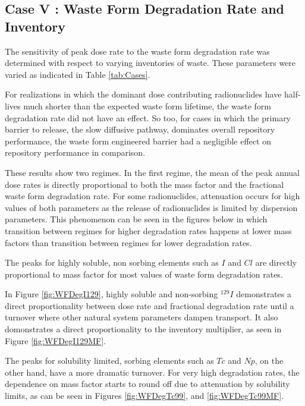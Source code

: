 
\subsection{Case V : Waste Form Degradation Rate and Inventory}

The sensitivity of peak dose rate to the waste form degradation rate was 
determined with respect to varying inventories of waste. These parameters were 
varied as indicated in Table \ref{tab:Cases}.

For realizations in which the dominant dose contributing 
radionuclides have half-lives much shorter than the expected waste form lifetime, 
the waste form degradation rate did not have an effect. So too, for 
cases in which the primary barrier to release, the slow diffusive pathway, 
dominates overall repository performance, the waste form engineered barrier
had a negligible effect on repository performance in comparison.

These results show two regimes. In the first regime, the mean of the peak annual 
dose rates is directly proportional to both the mass factor and the fractional 
waste form degradation rate. For some radionuclides, attenuation occurs for high 
values of both parameters as the release of radionuclides is limited by 
dispersion parameters. This phenomenon can be seen in the figures below in which 
transition between regimes for higher degradation rates happens at lower mass 
factors than transition between regimes for lower degradation rates. 

The peaks for highly soluble, non sorbing elements such as $I$ and $Cl$
are directly proportional to mass factor for most 
values of waste form degradation rates. 

In Figure \ref{fig:WFDegI129}, highly soluble and non-sorbing $^{129}I$ 
demonstrates a direct proportionality between dose rate and fractional 
degradation rate until a turnover where other natural system parameters dampen 
transport. It also domonstrates a direct proportionality to the inventory 
multiplier, as seen in Figure \ref{fig:WFDegI129MF}. 

The peaks for solubility limited, sorbing elements such as $Tc$ and $Np$, on the 
other hand, have a more dramatic turnover.  For very high degradation rates, the 
dependence on mass factor starts to round off due to attenuation by solubility 
limits, as can be seen in Figures 
\ref{fig:WFDegTc99}, and \ref{fig:WFDegTc99MF}.

